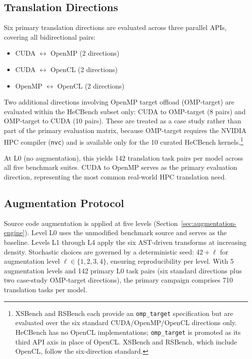 \documentclass[conference]{IEEEtran}
\begin{document}
\subsection{Translation Directions}
\label{sec:directions}

Six primary translation directions are evaluated across three parallel APIs, covering all bidirectional pairs:

\begin{itemize}
\item CUDA $\leftrightarrow$ OpenMP (2 directions)
\item CUDA $\leftrightarrow$ OpenCL (2 directions)
\item OpenMP $\leftrightarrow$ OpenCL (2 directions)
\end{itemize}

Two additional directions involving OpenMP target offload (OMP-target) are evaluated within the HeCBench subset only: CUDA to OMP-target (8 pairs) and OMP-target to CUDA (10 pairs). These are treated as a case study rather than part of the primary evaluation matrix, because OMP-target requires the NVIDIA HPC compiler (\texttt{nvc}) and is available only for the 10 curated HeCBench kernels.\footnote{XSBench and RSBench each provide an \texttt{omp\_target} specification but are evaluated over the six standard CUDA/OpenMP/OpenCL directions only. HeCBench has no OpenCL implementations; \texttt{omp\_target} is promoted as its third API axis in place of OpenCL. XSBench and RSBench, which include OpenCL, follow the six-direction standard.}

At L0 (no augmentation), this yields 142 translation task pairs per model across all five benchmark suites. CUDA to OpenMP serves as the primary evaluation direction, representing the most common real-world HPC translation need.

\subsection{Augmentation Protocol}
\label{sec:augmentation-protocol}

Source code augmentation is applied at five levels (Section~\ref{sec:augmentation-engine}). Level L0 uses the unmodified benchmark source and serves as the baseline. Levels L1 through L4 apply the six AST-driven transforms at increasing density. Stochastic choices are governed by a deterministic seed: $42 + \ell$ for augmentation level $\ell \in \{1,2,3,4\}$, ensuring reproducibility per level. With 5 augmentation levels and 142 primary L0 task pairs (six standard directions plus two case-study OMP-target directions), the primary campaign comprises 710 translation tasks per model.
\end{document}
